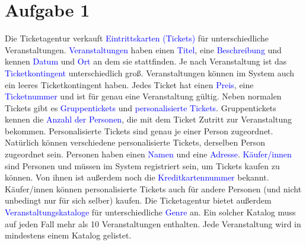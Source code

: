 \chapter*{Aufgabe 1}
    Die Ticketagentur verkauft \textcolor{blue}{Eintrittskarten (Tickets)} für unterschiedliche Veranstaltungen. \textcolor{blue}{Veranstaltungen} haben
    einen \textcolor{blue}{Titel}, eine \textcolor{blue}{Beschreibung} und kennen \textcolor{blue}{Datum} und \textcolor{blue}{Ort} an dem sie stattfinden. Je nach Veranstaltung ist das
    \textcolor{blue}{Ticketkontingent} unterschiedlich groß. Veranstaltungen können im System auch ein leeres Ticketkontingent haben.
    Jedes Ticket hat einen \textcolor{blue}{Preis}, eine \textcolor{blue}{Ticketnummer} und ist für genau eine Veranstaltung gültig. Neben normalen
    Tickets gibt es \textcolor{blue}{Gruppentickets} und \textcolor{blue}{personalisierte Tickets}. Gruppentickets kennen die \textcolor{blue}{Anzahl der Personen}, die mit
    dem Ticket Zutritt zur Veranstaltung bekommen. Personalisierte Tickets sind genau je einer Person zugeordnet.
    Natürlich können verschiedene personalisierte Tickets, derselben Person zugeordnet sein. Personen haben einen
    \textcolor{blue}{Namen} und eine \textcolor{blue}{Adresse}.
    \textcolor{blue}{Käufer/innen} sind Personen und müssen im System registriert sein, um Tickets kaufen zu können. Von ihnen ist
    außerdem noch die \textcolor{blue}{Kreditkartennummer} bekannt. Käufer/innen können personalisierte Tickets auch für andere
    Personen (und nicht unbedingt nur für sich selber) kaufen.
    Die Ticketagentur bietet außerdem \textcolor{blue}{Veranstaltungskataloge} für unterschiedliche \textcolor{blue}{Genre} an. Ein solcher Katalog muss
    auf jeden Fall mehr als 10 Veranstaltungen enthalten. Jede Veranstaltung wird in mindestens einem Katalog gelistet.
    
    
    